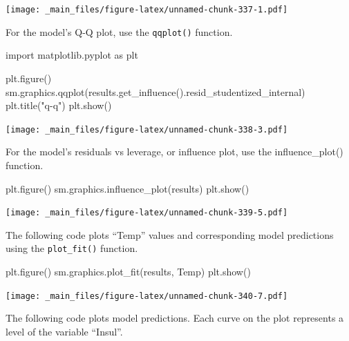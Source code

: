 \documentclass[
]{book}
\newenvironment{Shaded}{\begin{snugshade}}{\end{snugshade}}
\newcommand{\ImportTok}[1]{#1}
\newcommand{\NormalTok}[1]{#1}
\newcommand{\StringTok}[1]{\textcolor[rgb]{0.31,0.60,0.02}{#1}}
\begin{document}
\texttt{[image: \_main\_files/figure-latex/unnamed-chunk-337-1.pdf]}

For the model's Q-Q plot, use the \texttt{qqplot()} function.

\begin{Shaded}
\begin{Highlighting}[]
\ImportTok{import}\NormalTok{ matplotlib.pyplot }\ImportTok{as}\NormalTok{ plt}

\NormalTok{plt.figure()}
\NormalTok{sm.graphics.qqplot(results.get\_influence().resid\_studentized\_internal)}
\NormalTok{plt.title(}\StringTok{"q{-}q"}\NormalTok{)}
\NormalTok{plt.show()}
\end{Highlighting}
\end{Shaded}

\texttt{[image: \_main\_files/figure-latex/unnamed-chunk-338-3.pdf]}

For the model's residuals vs leverage, or influence plot, use the influence\_plot() function.

\begin{Shaded}
\begin{Highlighting}[]
\NormalTok{plt.figure()}
\NormalTok{sm.graphics.influence\_plot(results)}
\NormalTok{plt.show()}
\end{Highlighting}
\end{Shaded}

\texttt{[image: \_main\_files/figure-latex/unnamed-chunk-339-5.pdf]}

The following code plots ``Temp'' values and corresponding model predictions using the \texttt{plot\_fit()} function.

\begin{Shaded}
\begin{Highlighting}[]
\NormalTok{plt.figure()}
\NormalTok{sm.graphics.plot\_fit(results, }\StringTok{\textquotesingle{}Temp\textquotesingle{}}\NormalTok{)}
\NormalTok{plt.show()}
\end{Highlighting}
\end{Shaded}

\texttt{[image: \_main\_files/figure-latex/unnamed-chunk-340-7.pdf]}

The following code plots model predictions. Each curve on the plot represents a level of the variable ``Insul''.
\end{document}
